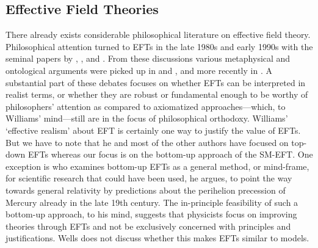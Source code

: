 \subsection{Effective Field Theories}

There already exists considerable philosophical literature on effective field theory.
Philosophical attention turned to EFTs in the late 1980s and early 1990s with the seminal papers by \citet{teller89}, \citet{cao1993}, and \citet{huggetweingard}. 
From these discussions various metaphysical and ontological arguments were picked up in \citet{castellani2002} and \citet{fraser2009}, and more recently in \citep{bain2013a,Ruetsche2018,williams2018}. 
A substantial part of these debates focuses on whether EFTs can be interpreted in realist terms, or whether they are robust or fundamental enough to be worthy of philosophers' attention as compared to axiomatized approaches---which, to Williams' mind---still are in the focus of philosophical orthodoxy. 
Williams' `effective realism' about EFT is certainly one way to justify the value of EFTs. 
But we have to note that he and most of the other authors have focused on top-down EFTs whereas our focus is on the bottom-up approach of the SM-EFT.
One exception is \citet{wells2011} who examines bottom-up EFTs as a general method, or mind-frame, for scientific research that could have been used, he argues, to point the way towards general relativity by predictions about the perihelion precession of Mercury already in the late 19th century. 
The in-principle feasibility of such a bottom-up approach, to his mind, suggests that physicists focus on improving theories through EFTs and not be exclusively concerned with principles and justifications.
Wells does not discuss whether this makes EFTs similar to models.

